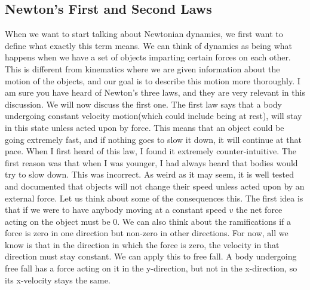 \documentclass{article}[gray]
\numberwithin{equation}{subsection}
\begin{document}
\subsection{Newton's First and Second Laws}
\newline
When we want to start talking about Newtonian dynamics, we first want to define what exactly this term means. We can think of dynamics as being what happens when we have a set of objects imparting certain forces on each other. This is different from kinematics where we are given information about the motion of the objects, and our goal is to describe this motion more thoroughly. I am sure you have heard of Newton’s three laws, and they are very relevant in this discussion. We will now discuss the first one. The first law says that a body undergoing constant velocity motion(which could include being at rest), will stay in this state unless acted upon by force. This means that an object could be going extremely fast, and if nothing goes to slow it down, it will continue at that pace. When I first heard of this law, I found it extremely counter-intuitive. The first reason was that when I was younger, I had always heard that bodies would try to slow down. This was incorrect. As weird as it may seem, it is well tested and documented that objects will not change their speed unless acted upon by an external force. Let us think about some of the consequences this. The first idea is that if we were to have anybody moving at a constant speed $v$ the net force acting on the object must be 0. We can also think about the ramifications if a force is zero in one direction but non-zero in other directions. For now, all we know is that in the direction in which the force is zero, the velocity in that direction must stay constant. We can apply this to free fall. A body undergoing free fall has a force acting on it in the y-direction, but not in the x-direction, so its x-velocity stays the same. 
\end{document}
